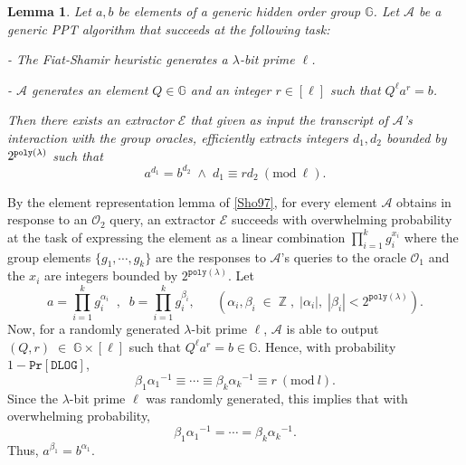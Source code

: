 \documentclass[11pt, lettersize, notitlepage, leqno, footskip=0.6cm]{article}
\newcommand{\bz}{\mathbb Z}
\newcommand{\pl}{\prod\limits}
\newcommand{\ttt}{\texttt}
\newcommand{\bG}{\mathbb{G}}
\newcommand{\mc}{\mathcal}
\newcommand{\mb}{\mathbb}
\newcommand{\al}{\alpha}
\newcommand{\be}{\beta}
\newcommand{\lam}{\lambda}
\newcommand{\A}{\mc{A}}
\newcommand{\vs}{\vspace{-0.15cm}}
\newcommand{\noin}{\noindent}
\newcommand{\op}{overwhelming probability}
\newcommand{\Mod}[1]{\ (\mathrm{mod}\ #1)}
\newcommand{\E}{\mc{E}}
\newtheorem{Lem}[Thm]{Lemma}
\numberwithin{equation}{section}
\begin{document}
\begin{Lem}\label{root} Let $a, b$ be elements of a generic hidden order group $\bG$. Let $\mc{A}$ be a generic PPT algorithm that succeeds at the following task:

\noin - The Fiat-Shamir heuristic generates a $\lam$-bit prime $\ell$.

\noin - $\mc{A}$ generates an element $Q\in \mb{G}$ and an integer $r\in [\ell]$ such that $Q^{\ell}a^r = b$.

\noin Then there exists an extractor \hspace{0.05cm}$\E$ that given as input the transcript of $\A$'s interaction with the group oracles, efficiently extracts integers $d_1,d_2$ bounded by $2^{\tt{poly}(\lam)}$ such that \vs $$a^{d_1} = b^{d_2}\;\wedge\;d_1\equiv rd_2\Mod{\ell}.$$\end{Lem}

\begin{prf} By the element representation lemma of \hyperlink{Sho97}{[Sho97]}, for every element $\mc{A}$ obtains in response to an $\mc{O}_2$ query, an extractor $\E$ succeeds with overwhelming probability at the task of expressing the element as a linear combination $\prod_{i=1}^k g_i^{x_i}$ where the group elements $\{g_1,\cdots,g_k\}$ are the responses to $\A$'s queries to the oracle $\mc{O}_1$ and the $x_i$ are integers bounded by $2^{\ttt{poly}(\lam)}$. Let \vspace{-0.3cm} $$a = \pl_{i=1}^k g_i^{\al_i}\;\;,\;\; b = \pl_{i=1}^k g_i^{\be_i},\;\;\;\;\;\;(\al_i,\be_i\;\in\;\bz\;,\;|\al_i|,\;|\be_{i}| < 2^{\ttt{poly}(\lam)}).$$ Now, for a randomly generated $\lam$-bit prime $\ell$, $\mc{A}$ is able to output $(Q, r)\; \in\;\bG \times [\ell]$ such that $Q^{\ell}a^r = b\in \bG$. Hence, with probability $1-\ttt{Pr}[\ttt{DLOG}]$,  \vs $${\be_1}{\al_1}^{-1}\equiv\cdots\equiv {\be_k}{\al_k}^{-1}\equiv r \Mod{l}.$$ Since the $\lam$-bit prime $\ell$ was randomly generated, this implies that with \op, \vs $${\be_1}{\al_1}^{-1} = \cdots =  {\be_k}{\al_k}^{-1}.$$ Thus, $a^{\be_1} = b^{\al_1}$. \end{prf}
\vspace{0.1cm}
\end{document}
